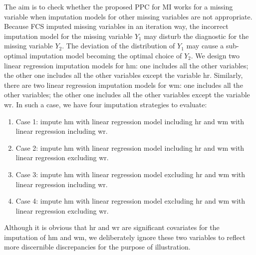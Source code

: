 \documentclass[12pt, fullpage, a4paper]{article}
\begin{document}
The aim is to check whether the proposed PPC for MI works for a missing variable when imputation models for other missing variables are not appropriate. Because FCS imputed missing variables in an iteration way, the incorrect imputation model for the missing variable $Y_1$ may disturb the diagnostic for the missing variable $Y_2$. The deviation of the distribution of $Y_1$ may cause a sub-optimal imputation model becoming the optimal choice of $Y_2$. We design two linear regression imputation models for hm: one includes all the other variables; the other one includes all the other variables except the variable hr. Similarly, there are two linear regression imputation models for wm: one includes all the other variables; the other one includes all the other variables except the variable wr. In such a case, we have four imputation strategies to evaluate:
\begin{enumerate}
	\item Case 1: impute hm with linear regression model including hr and wm with linear regression including wr.
	\item Case 2: impute hm with linear regression model including hr and wm with linear regression excluding wr.
	\item Case 3: impute hm with linear regression model excluding hr and wm with linear regression including wr.
	\item Case 4: impute hm with linear regression model excluding hr and wm with linear regression excluding wr.
\end{enumerate}
Although it is obvious that hr and wr are significant covariates for the imputation of hm and wm, we deliberately ignore these two variables to reflect more discernible discrepancies for the purpose of illustration. 
\end{document}
